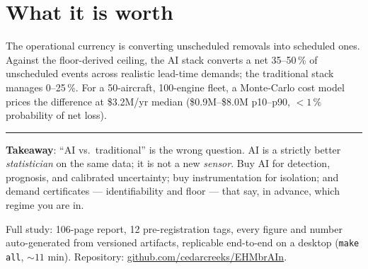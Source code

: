 \documentclass[11pt,twocolumn]{article}
\begin{document}
\section{What it is worth}
The operational currency is converting unscheduled removals into scheduled ones. Against
the floor-derived ceiling, the AI stack converts a net 35--50\,\% of unscheduled events
across realistic lead-time demands; the traditional stack manages 0--25\,\%. For a
50-aircraft, 100-engine fleet, a Monte-Carlo cost model prices the difference at
\$3.2M/yr median (\$0.9M--\$8.0M p10--p90, ${<}1\,\%$ probability of net loss).

\vspace{1mm}
\noindent\rule{\linewidth}{0.4pt}
{\footnotesize \textbf{Takeaway}: ``AI vs.\ traditional'' is the wrong question. AI is a
strictly better \emph{statistician} on the same data; it is not a new \emph{sensor}. Buy AI
for detection, prognosis, and calibrated uncertainty; buy instrumentation for isolation;
and demand certificates --- identifiability and floor --- that say, in advance, which
regime you are in.\par
\vspace{0.8mm}
Full study: 106-page report, 12 pre-registration tags, every figure and number
auto-generated from versioned artifacts, replicable end-to-end on a desktop
(\texttt{make all}, ${\sim}11$ min). Repository:
\href{https://github.com/cedarcreeks/EHMbrAIn}{github.com/cedarcreeks/EHMbrAIn}.\par}
\end{document}
